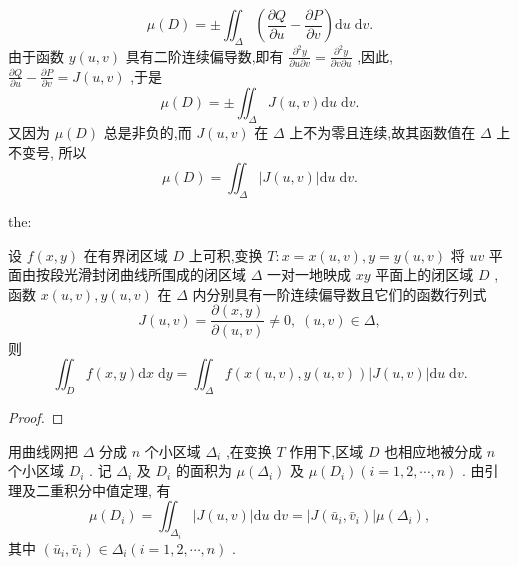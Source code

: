 \[
\mu \left( D\right)  =  \pm  {\iint }_{\Delta }\left( {\frac{\partial Q}{\partial u} - \frac{\partial P}{\partial v}}\right) \mathrm{d}u\mathrm{\;d}v.
\]
由于函数 \(y\left( {u,v}\right)\) 具有二阶连续偏导数,即有 \(\frac{{\partial }^{2}y}{\partial u\partial v} = \frac{{\partial }^{2}y}{\partial v\partial u}\) ,因此, \(\frac{\partial Q}{\partial u} - \frac{\partial P}{\partial v} = J\left( {u,v}\right)\) ,于是
\[
\mu \left( D\right)  =  \pm  {\iint }_{\Delta }J\left( {u,v}\right) \mathrm{d}u\mathrm{\;d}v.
\]
又因为 \(\mu \left( D\right)\) 总是非负的,而 \(J\left( {u,v}\right)\) 在 \(\Delta\) 上不为零且连续,故其函数值在 \(\Delta\) 上不变号, 所以
\[
\mu \left( D\right)  = {\iint }_{\Delta }\left| {J\left( {u,v}\right) }\right| \mathrm{d}u\mathrm{\;d}v.
\]
\begin{theorem}{}{the:}

\end{theorem}
 设 \(f\left( {x,y}\right)\) 在有界闭区域 \(D\) 上可积,变换 \(T : x = x\left( {u,v}\right) ,y = y\left( {u,v}\right)\) 将 \({uv}\) 平面由按段光滑封闭曲线所围成的闭区域 \(\Delta\) 一对一地映成 \({xy}\) 平面上的闭区域 \(D\) , 函数 \(x\left( {u,v}\right) ,y\left( {u,v}\right)\) 在 \(\Delta\) 内分别具有一阶连续偏导数且它们的函数行列式
\[
J\left( {u,v}\right)  = \frac{\partial \left( {x,y}\right) }{\partial \left( {u,v}\right) } \neq  0,\;\left( {u,v}\right)  \in  \Delta ,
\]
则
\[
{\iint }_{D}f\left( {x,y}\right) \mathrm{d}x\mathrm{\;d}y = {\iint }_{\Delta }f\left( {x\left( {u,v}\right) ,y\left( {u,v}\right) }\right) \left| {J\left( {u,v}\right) }\right| \mathrm{d}u\mathrm{\;d}v.
\]
\begin{proof}

\end{proof}
用曲线网把 \(\Delta\) 分成 \(n\) 个小区域 \({\Delta }_{i}\) ,在变换 \(T\) 作用下,区域 \(D\) 也相应地被分成 \(n\) 个小区域 \({D}_{i}\) . 记 \({\Delta }_{i}\) 及 \({D}_{i}\) 的面积为 \(\mu \left( {\Delta }_{i}\right)\) 及 \(\mu \left( {D}_{i}\right) \left( {i = 1,2,\cdots ,n}\right)\) . 由引理及二重积分中值定理, 有
\[
\mu \left( {D}_{i}\right)  = {\iint }_{{\Delta }_{i}}\left| {J\left( {u,v}\right) }\right| \mathrm{d}u\mathrm{\;d}v = \left| {J\left( {{\bar{u}}_{i},{\bar{v}}_{i}}\right) }\right| \mu \left( {\Delta }_{i}\right) ,
\]
其中 \(\left( {{\bar{u}}_{i},{\bar{v}}_{i}}\right)  \in  {\Delta }_{i}\left( {i = 1,2,\cdots ,n}\right)\) .

